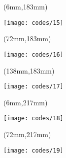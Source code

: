     \begin{textblock*}{66mm}(6mm,183mm)
        \begin{minipage}[t][34mm][t]{\textwidth}
        \vspace*{\fill}
        \texttt{[image: codes/15]}
        \vspace*{\fill}
        \end{minipage}
    \end{textblock*}


    \begin{textblock*}{66mm}(72mm,183mm)
        \begin{minipage}[t][34mm][t]{\textwidth}
        \vspace*{\fill}
        \texttt{[image: codes/16]}
        \vspace*{\fill}
        \end{minipage}
    \end{textblock*}


    \begin{textblock*}{66mm}(138mm,183mm)
        \begin{minipage}[t][34mm][t]{\textwidth}
        \vspace*{\fill}
        \texttt{[image: codes/17]}
        \vspace*{\fill}
        \end{minipage}
    \end{textblock*}


    \begin{textblock*}{66mm}(6mm,217mm)
        \begin{minipage}[t][34mm][t]{\textwidth}
        \vspace*{\fill}
        \texttt{[image: codes/18]}
        \vspace*{\fill}
        \end{minipage}
    \end{textblock*}


    \begin{textblock*}{66mm}(72mm,217mm)
        \begin{minipage}[t][34mm][t]{\textwidth}
        \vspace*{\fill}
        \texttt{[image: codes/19]}
        \vspace*{\fill}
        \end{minipage}
    \end{textblock*}


